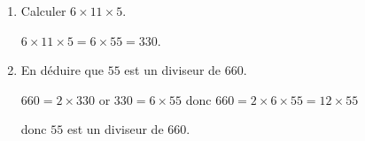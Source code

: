     \begin{enumerate}
        \item Calculer $6\times 11\times 5$.

        $6\times 11\times 5 = 6\times 55 = 330$.
        \item En déduire que $55$ est un diviseur de $660$.

        $660 = 2\times 330$ or $330 = 6\times 55$ donc $660 = 2\times 6\times 55= 12\times 55$

        donc $55$ est un diviseur de $660$.
    \end{enumerate}
